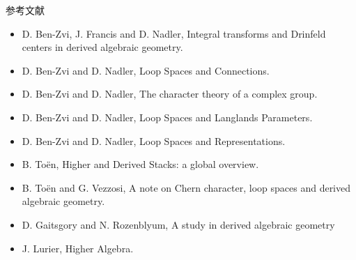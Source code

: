 \documentclass[dvipdfmx]{beamer}
\begin{document}
\begin{comment}
\begin{frame}{Deligne-Kontsevich conjecture}
monoidal stable categoryのDerinfeld centerはassociative (or $A_\infty$)-algのHochshild cohomologyのcategorical analogueである。
Deligneの予想は、Hochshild cochain complexはGerstenhaber algebranの持ち上げである$E_2$-algebraの構造を持つこと。
これのcyclic versionとして、Frobeinus algebraのHochshild cochainはframed $E_2$ (or ribbon) algebraの構造を持つ。
さらにKontsevichはこの高次版として、$E_n$-algebraのHochshild cochainは$E_{n+1}$-algebraの構造を持つことを予想。

CostelloとKontsevich-Soibelmanはalgebra $A$に対して$Z_A(S^1)=HC(A)$となるようなTFTから予想が従うことを説明した。

これの圏論類似として、monoidal $\infty$-categoryのDrinfeld centerが$E_2$-categoryであること。
\end{frame}
\end{comment}

\begin{frame}{参考文献}
\begin{itemize}
\item D. Ben-Zvi, J. Francis and D. Nadler, Integral transforms and Drinfeld centers in derived algebraic geometry.
\item D. Ben-Zvi and D. Nadler, Loop Spaces and Connections.
\item D. Ben-Zvi and D. Nadler, The character theory of a complex group.
\item D. Ben-Zvi and D. Nadler, Loop Spaces and Langlands Parameters.
\item D. Ben-Zvi and D. Nadler, Loop Spaces and Representations.
\item B. To\"en, Higher and Derived Stacks: a global overview.
\item B. To\"en and G. Vezzosi, A note on Chern character, loop spaces and derived algebraic geometry.
\item D. Gaitsgory and N. Rozenblyum, A study in derived algebraic geometry
\item J. Lurier, Higher Algebra.
\end{itemize}
\end{frame}
\end{document}
